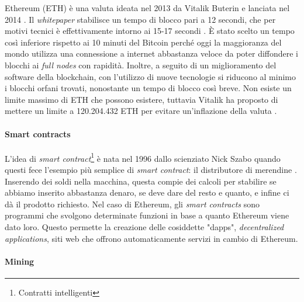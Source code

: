 \documentclass {article}
\begin{document}
Ethereum (ETH) è una valuta ideata nel 2013 da Vitalik Buterin e lanciata nel 2014 \cite{ethorigins}.
Il \textit{whitepaper} stabilisce un tempo di blocco pari a 12 secondi, che per motivi tecnici è effettivamente intorno ai 15-17 secondi \cite{ethblock1} \cite{ethblock2}.
È stato scelto un tempo così inferiore rispetto ai 10 minuti del Bitcoin perché oggi la maggioranza del mondo utilizza una connessione a internet abbastanza veloce da poter diffondere i blocchi ai \textit{full nodes} con rapidità.
Inoltre, a seguito di un miglioramento del software della blockchain, con l'utilizzo di nuove tecnologie si riducono al minimo i blocchi orfani trovati, nonostante un tempo di blocco così breve.
Non esiste un limite massimo di ETH che possono esistere, tuttavia Vitalik ha proposto di mettere un limite a 120.204.432 ETH per evitare un'inflazione della valuta \cite{ethmax}.

\paragraph {Smart contracts}

L'idea di \textit{smart contract}\footnote{Contratti intelligenti} è nata nel 1996 dallo scienziato Nick Szabo quando questi fece l'esempio più semplice di \textit{smart contract}: il distributore di merendine \cite{nickszabo}.
Inserendo dei soldi nella macchina, questa compie dei calcoli per stabilire se abbiamo inserito abbastanza denaro, se deve dare del resto e quanto, e infine ci dà il prodotto richiesto.
Nel caso di Ethereum, gli \textit{smart contracts} sono programmi che svolgono determinate funzioni in base a quanto Ethereum viene dato loro.
Questo permette la creazione delle cosiddette "dapps", \textit{decentralized applications}, siti web che offrono automaticamente servizi in cambio di Ethereum.

\paragraph {Mining}
\end{document}
